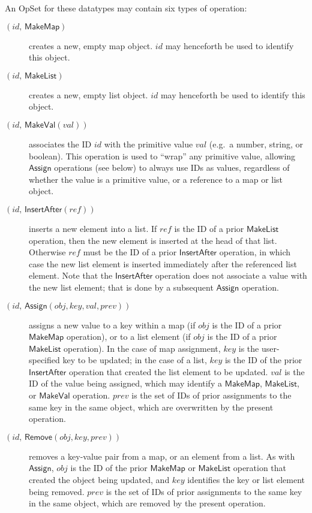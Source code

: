 An OpSet for these datatypes may contain six types of operation:
\begin{description}
    \item[$(\mathit{id},\, \mathsf{MakeMap})$] creates a new, empty map object.
        $\mathit{id}$ may henceforth be used to identify this object.
    \item[$(\mathit{id},\, \mathsf{MakeList})$] creates a new, empty list object.
        $\mathit{id}$ may henceforth be used to identify this object.
    \item[$(\mathit{id},\, \mathsf{MakeVal}(\mathit{val}))$] associates the ID $\mathit{id}$ with the primitive value $\mathit{val}$ (e.g.\ a number, string, or boolean).
        This operation is used to ``wrap'' any primitive value, allowing $\mathsf{Assign}$ operations (see below) to always use IDs as values, regardless of whether the value is a primitive value, or a reference to a map or list object.
    \item[$(\mathit{id},\, \mathsf{InsertAfter}(\mathit{ref}))$] inserts a new element into a list.
        If $\mathit{ref}$ is the ID of a prior $\mathsf{MakeList}$ operation, then the new element is inserted at the head of that list.
        Otherwise $\mathit{ref}$ must be the ID of a prior $\mathsf{InsertAfter}$ operation, in which case the new list element is inserted immediately after the referenced list element.
        Note that the $\mathsf{InsertAfter}$ operation does not associate a value with the new list element; that is done by a subsequent $\mathsf{Assign}$ operation.
    \item[$(\mathit{id},\, \mathsf{Assign}(\mathit{obj}, \mathit{key}, \mathit{val}, \mathit{prev}))$] assigns a new value to a key within a map (if $\mathit{obj}$ is the ID of a prior $\mathsf{MakeMap}$ operation), or to a list element (if $\mathit{obj}$ is the ID of a prior $\mathsf{MakeList}$ operation).
        In the case of map assignment, $\mathit{key}$ is the user-specified key to be updated; in the case of a list, $\mathit{key}$ is the ID of the prior $\mathsf{InsertAfter}$ operation that created the list element to be updated.
        $\mathit{val}$ is the ID of the value being assigned, which may identify a $\mathsf{MakeMap}$, $\mathsf{MakeList}$, or $\mathsf{MakeVal}$ operation.
        $\mathit{prev}$ is the set of IDs of prior assignments to the same key in the same object, which are overwritten by the present operation.
    \item[$(\mathit{id},\, \mathsf{Remove}(\mathit{obj}, \mathit{key}, \mathit{prev}))$] removes a key-value pair from a map, or an element from a list.
        As with $\mathsf{Assign}$, $\mathit{obj}$ is the ID of the prior $\mathsf{MakeMap}$ or $\mathsf{MakeList}$ operation that created the object being updated, and $\mathit{key}$ identifies the key or list element being removed.
        $\mathit{prev}$ is the set of IDs of prior assignments to the same key in the same object, which are removed by the present operation.
\end{description}

